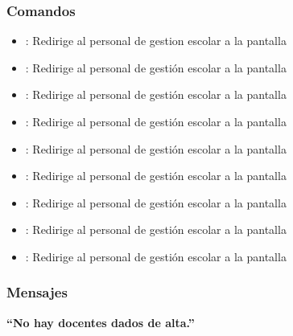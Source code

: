 \subsubsection{Comandos}
\begin{itemize}
    \item {}: Redirige al personal de gestion escolar a la pantalla 
    
    \item {}: Redirige al personal de gestión escolar a la pantalla 
    \item {}: Redirige al personal de gestión escolar a la pantalla 
    
    \item {}: Redirige al personal de gestión escolar a la pantalla 
    \item {}: Redirige al personal de gestión escolar a la pantalla 
    
    \item {}: Redirige al personal de gestión escolar a la pantalla 
    \item {}: Redirige al personal de gestión escolar a la pantalla 
    
    \item {}: Redirige al personal de gestión escolar a la pantalla 
    \item {}: Redirige al personal de gestión escolar a la pantalla    
\end{itemize}

\subsubsection{Mensajes}

\begin{Citemize}
    \item {\bf  ``No hay docentes dados de alta.''}
\end{Citemize}


